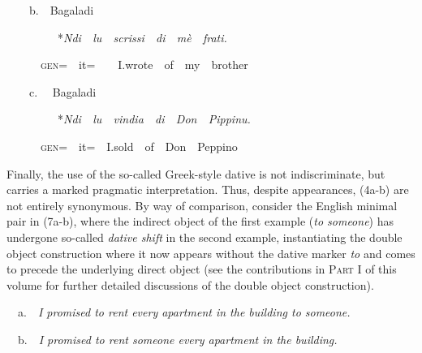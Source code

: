 \documentclass[output=paper,modfonts,nonflat]{langsci/langscibook}
\begin{document}
\begin{styleesempi}
\ \ \ \ b.\ \ Bagaladi
\end{styleesempi}

\begin{styleesempi}
\ \ \ \  \ \ \ \ \ *\textit{Ndi\ \ lu\ \ scrissi\ \ di\ \ mè\ \ frati.}
\end{styleesempi}

\begin{styleStandard}
\ \ \ \ \ \ \textsc{gen}=\ \ it=\ \ \ \ I.wrote\ \ of\ \ my\ \ brother
\end{styleStandard}

\begin{styleStandard}
\ \ \ \ c. \ \ Bagaladi
\end{styleStandard}

\begin{styleStandard}
\ \ \ \  \ \ \ \ \ *\textit{Ndi\ \ lu\ \ vindia\ \ di\ \ Don\ \ Pippinu.}
\end{styleStandard}

\begin{styleStandard}
\ \ \ \ \ \ \textsc{gen}=\ \ it=\ \ I.sold\ \ of\ \ Don\ \ Peppino
\end{styleStandard}

\begin{styleStandard}
Finally, the use of the so-called Greek-style dative\textit{ }is not indiscriminate, but carries a marked pragmatic interpretation. Thus, despite appearances, (4a-b) are not entirely synonymous. By way of comparison, consider the English minimal pair in (7a-b), where the indirect object of the first example (\textit{to someone}) has undergone so-called \textit{dative shift }in the second example, instantiating the double object construction where it now appears without the dative marker \textit{to }and comes to precede the underlying direct object (see the contributions in \textsc{Part I} of this volume for further detailed discussions of the double object construction).
\end{styleStandard}

\begin{listWWNumviiileveli}
\item 
\begin{styleListParagraph}
\ \ a.\ \ \textit{I promised to rent every apartment in the building to someone.}
\end{styleListParagraph}
\end{listWWNumviiileveli}
\begin{styleListParagraph}
\ \ b.\ \ \textit{I promised to rent someone every apartment in the building.}
\end{styleListParagraph}
\end{document}
